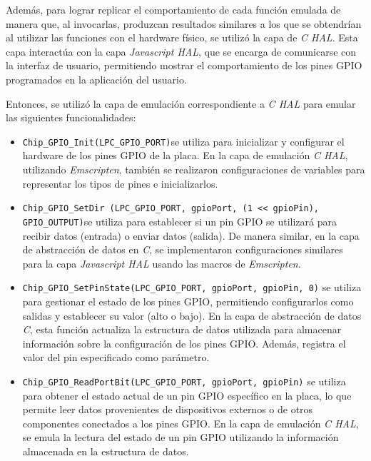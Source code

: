 Además, para lograr replicar el comportamiento de cada función emulada de manera que, al invocarlas, produzcan resultados similares a los que se obtendrían al utilizar las funciones con el hardware físico, se utilizó la capa de \textit{C HAL}. Esta capa interactúa con la capa \textit{Javascript HAL}, que se encarga de comunicarse con la interfaz de usuario, permitiendo mostrar el comportamiento de los pines GPIO programados en la aplicación del usuario.

Entonces, se utilizó la capa de emulación correspondiente a \textit{C HAL} para emular las siguientes funcionalidades:

\begin{itemize}
	\item \texttt{Chip\_GPIO\_Init(LPC\_GPIO\_PORT)}se utiliza para inicializar y configurar el hardware de los pines GPIO de la placa. En la capa de emulación \textit{C HAL}, utilizando  \textit{Emscripten}, también se realizaron configuraciones de variables para representar los tipos de pines e inicializarlos.
	
	\item \texttt{Chip\_GPIO\_SetDir (LPC\_GPIO\_PORT, gpioPort, \newline (1 \<<\<<  gpioPin), GPIO\_OUTPUT)}se utiliza para establecer si un pin GPIO se utilizará para recibir datos (entrada) o enviar datos (salida). De manera similar, en la capa de abstracción de datos en \textit{C}, se implementaron configuraciones similares para la capa \textit{Javascript HAL} usando las macros de \textit{Emscripten}.
	
	\item \texttt{Chip\_GPIO\_SetPinState(LPC\_GPIO\_PORT, gpioPort, \newline gpioPin, 0)} se utiliza para gestionar el estado de los pines GPIO, permitiendo configurarlos como salidas y establecer su valor (alto o bajo). En la capa de abstracción de datos \textit{C}, esta función actualiza la estructura de datos utilizada para almacenar información sobre la configuración de los pines GPIO. Además, registra el valor del pin especificado como parámetro.

	\item \texttt{Chip\_GPIO\_ReadPortBit(LPC\_GPIO\_PORT, gpioPort, \newline gpioPin)} se utiliza para obtener el estado actual de un pin GPIO específico en la placa, lo que permite leer datos provenientes de dispositivos externos o de otros componentes conectados a los pines GPIO. En la capa de emulación \textit{C HAL}, se emula la lectura del estado de un pin GPIO utilizando la información almacenada en la estructura de datos.
\end{itemize}


